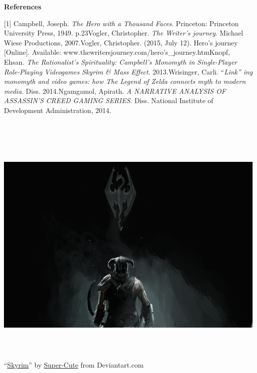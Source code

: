 \documentclass[a4paper]{article}
\newcommand\textstyleStrongEmphasis[1]{\textbf{#1}}
\newcommand\textstyleEmphasis[1]{\textit{#1}}
\begin{document}
\textstyleStrongEmphasis{References}

[1] Campbell, Joseph. \textit{The Hero with a Thousand Faces}.
Princeton: Princeton University Press, 1949. p.23\newline
[2] Vogler, Christopher. \textit{The Writer{\textquoteright}s journey}.
Michael Wiese Productions, 2007.\newline
[3] Vogler, Christopher. (2015, July 12). Hero{\textquoteright}s journey
[Online]. Available:
www.thewritersjourney.com/hero{\textquoteright}s\_journey.htm\newline
[4] Knopf, Ehsan. \textstyleEmphasis{The Rationalist{\textquoteright}s
Spirituality: Campbell{\textquoteright}s Monomyth in Single-Player
Role-Playing Videogames Skyrim \& Mass Effect.} 2013.\newline
[5] Wrisinger, Carli.
{\textquotedblleft}\textit{Link{\textquotedblright} ing monomyth and
video games: how The Legend of Zelda connects myth to modern media}.
Diss. 2014.\newline
[6] Ngamgamol, Apirath. \textit{A NARRATIVE ANALYSIS OF
ASSASSIN{\textquoteright}S CREED GAMING SERIES}. Diss. National
Institute of Development Administration, 2014.

~

\href{http://www.velonuboso.com/made/blog/wp-content/uploads/2015/07/skyrim_by_super_cute-d4g06ao.png}{
\includegraphics[width=17.057cm,height=11.384cm]{makingofmade113-img15.png}
}

{\textquotedblleft}\href{http://www.deviantart.com/art/Skyrim-268746720}{Skyrim}{\textquotedblright}
by \href{http://super-cute.deviantart.com/}{Super-Cute} from
Deviantart.com
\end{document}
